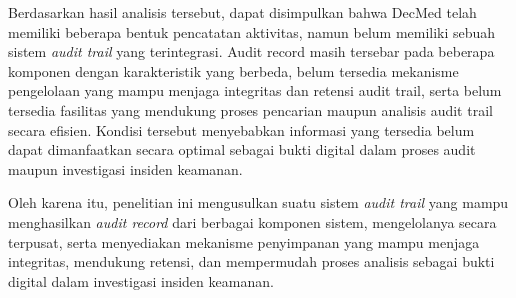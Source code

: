 Berdasarkan hasil analisis tersebut, dapat disimpulkan bahwa DecMed telah memiliki beberapa bentuk pencatatan aktivitas, namun belum memiliki sebuah sistem \textit{audit trail} yang terintegrasi. Audit record masih tersebar pada beberapa komponen dengan karakteristik yang berbeda, belum tersedia mekanisme pengelolaan yang mampu menjaga integritas dan retensi audit trail, serta belum tersedia fasilitas yang mendukung proses pencarian maupun analisis audit trail secara efisien. Kondisi tersebut menyebabkan informasi yang tersedia belum dapat dimanfaatkan secara optimal sebagai bukti digital dalam proses audit maupun investigasi insiden keamanan.

Oleh karena itu, penelitian ini mengusulkan suatu sistem \textit{audit trail} yang mampu menghasilkan \textit{audit record} dari berbagai komponen sistem, mengelolanya secara terpusat, serta menyediakan mekanisme penyimpanan yang mampu menjaga integritas, mendukung retensi, dan mempermudah proses analisis sebagai bukti digital dalam investigasi insiden keamanan.





